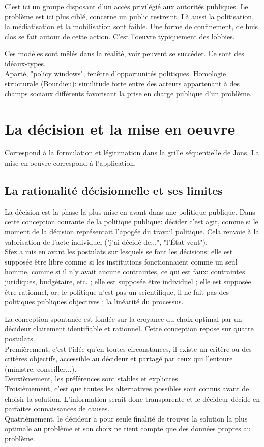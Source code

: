 \documentclass[10pt, a4paper, openany]{book}
\begin{document}
C'est ici un groupe disposant d'un accès privilégié aux autorités publiques. Le problème est ici plus ciblé, concerne un public restreint. Là aussi la politisation, la médiatisation et la mobilisation sont faible. Une forme de confinement, de huis clos se fait autour de cette action. C'est l'oeuvre typiquement des lobbies. 


Ces modèles sont mêlés dans la réalité, voir peuvent se succéder. Ce sont des idéaux-types. \\
Aparté, "policy windows", fenêtre d'opportunités politiques. Homologie structurale (Bourdieu): similitude forte entre des acteurs appartenant à des champs sociaux différents favorisant la prise en charge publique d'un problème. 


\chapter{La décision et la mise en oeuvre}

Correspond à la formulation et légitimation dans la grille séquentielle de Jons. La mise en oeuvre correspond à l'application. 

\section{La rationalité décisionnelle et ses limites}

La décision est la phase la plus mise en avant dans une politique publique. Dans cette conception courante de la politique publique: décider c'est agir, comme si le moment de la décision représentait l'apogée du travail politique. Cela renvoie à la valorisation de l'acte individuel ("j'ai décidé de...", "l'État veut"). \\
Sfez a mis en avant les postulats sur lesquels se font les décisions: elle est supposée être libre comme si les institutions fonctionnaient comme un seul homme, comme si il n'y avait aucune contraintes, ce qui est faux: contraintes juridiques, budgétaire, etc. ; elle est supposée être individuel ; elle est supposée être rationnel, or, le politique n'est pas un scientifique, il ne fait pas des politiques publiques objectives ; la linéarité du processus. 


La conception spontanée est fondée sur la croyance du choix optimal par un décideur clairement identifiable et rationnel. Cette conception repose sur quatre postulats. \\
Premièrement, c'est l'idée qu'en toutes circonstances, il existe un critère ou des critères objectifs, accessible au décideur et partagé par ceux qui l'entoure (ministre, conseiller...). \\
Deuxièmement, les préférences sont stables et explicites. \\
Troisièmement, c'est que toutes les alternatives possibles sont connus avant de choisir la solution. L'information serait donc transparente et le décideur décide en parfaites connaissances de causes. \\
Quatrièmement, le décideur a pour seule finalité de trouver la solution la plus optimale au problème et son choix ne tient compte que des données propres au problème.
\end{document}
